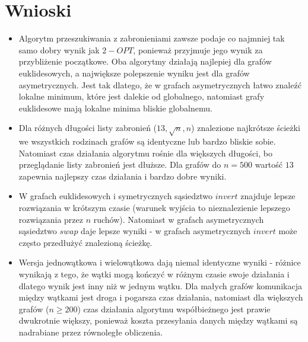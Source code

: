 \documentclass{article}
\begin{document}
\section{Wnioski}
\begin{itemize}
\item Algorytm przeszukiwania z zabronieniami zawsze podaje co najmniej tak samo dobry wynik jak $2-OPT$, ponieważ przyjmuje jego wynik za przybliżenie początkowe. Oba algorytmy działają najlepiej dla grafów euklidesowych, a największe polepszenie wyniku jest dla grafów asymetrycznych. Jest tak dlatego, że w grafach asymetrycznych łatwo znaleźć lokalne minimum, które jest dalekie od globalnego, natomiast grafy euklidesowe mają lokalne minima bliskie globalnemu.
\item Dla różnych długości listy zabronień ($13, \sqrt{n}, n$) znalezione najkrótsze ścieżki we wszystkich rodzinach grafów są identyczne lub bardzo bliskie sobie. Natomiast czas działania algorytmu rośnie dla większych długości, bo przeglądanie listy zabronień jest dłuższe. Dla grafów do $n=500$ wartość $13$ zapewnia najlepszy czas działania i bardzo dobre wyniki.
\item W grafach euklidesowych i symetrycznych sąsiedztwo $invert$ znajduje lepsze rozwiązania w krótszym czasie (warunek wyjścia to nieznalezienie lepszego rozwiązania przez $n$ ruchów). Natomiast w grafach asymetrycznych sąsiedztwo $swap$ daje lepsze wyniki - w grafach asymetrycznych $invert$ może często przedłużyć znalezioną ścieżkę.
\item Wersja jednowątkowa i wielowątkowa dają niemal identyczne wyniki - różnice wynikają z tego, że wątki mogą kończyć w różnym czasie swoje działania i dlatego wynik jest inny niż w jednym wątku. Dla małych grafów komunikacja między wątkami jest droga i pogarsza czas działania, natomiast dla większych grafów ($n\geq 200$) czas działania algorytmu współbieżnego jest prawie dwukrotnie większy, ponieważ koszta przesyłania danych między wątkami są nadrabiane przez równoległe obliczenia.  
\end{itemize}
\end{document}
